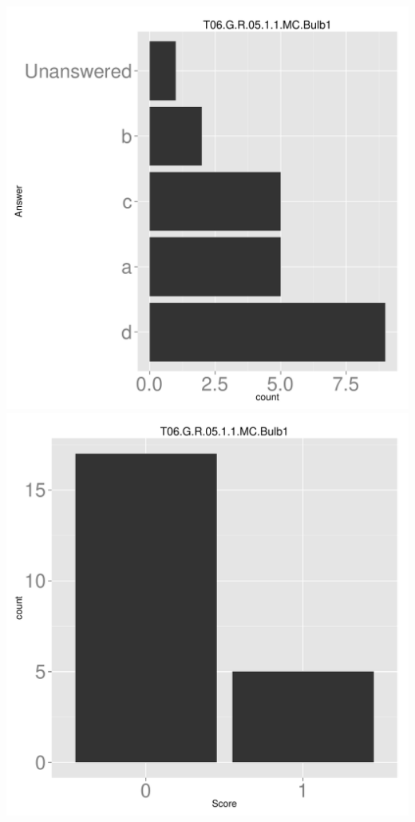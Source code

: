 \documentclass[12pt,nohyper]{tufte-handout}\usepackage[]{graphicx}\usepackage[]{color}
\begin{document}
\begin{center} \includegraphics[width=.45\linewidth]{Topic06_71_answer} \includegraphics[width=.45\linewidth]{Topic06_71_score} \end{center} 
\end{document}

